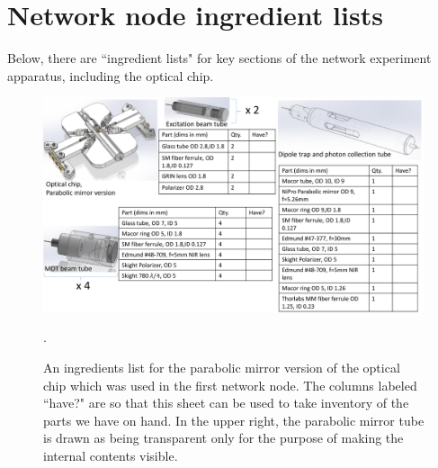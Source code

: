 \chapter{Network node ingredient lists}\label{ch:ingredients}



Below, there are ``ingredient lists" for key sections of the network experiment apparatus, including the optical chip.

\newpage

\begin{figure}
    \centering
    \includegraphics[width=1\textwidth]{Images/optical_chip_parts_mirror_version_20230316.pdf}
    \caption{An ingredients list for the parabolic mirror version of the optical chip which was used in the first network node. The columns labeled ``have?" are so that this sheet can be used to take inventory of the parts we have on hand. In the upper right, the parabolic mirror tube is drawn as being transparent only for the purpose of making the internal contents visible.}.
    \label{fig:mirror_chip_ingredients}
\end{figure}

\newpage
